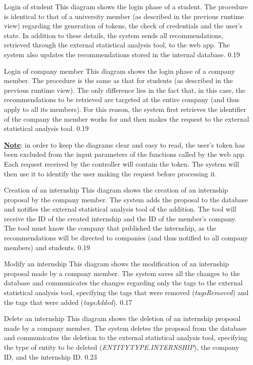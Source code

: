 \runtimeview
{Login of student}
{
    This diagram shows the login phase of a student. The procedure is identical to that of a university member (as described in the previous runtime view) regarding the generation of tokens, the check of credentials and the user's state. In addition to these details, the system sends all recommendations, retrieved through the external statistical analysis tool, to the web app. The system also updates the recommendations stored in the internal database.
}
{0.19}

\runtimeview
{Login of company member}
{
    This diagram shows the login phase of a company member. The procedure is the same as that for students (as described in the previous runtime view). The only difference lies in the fact that, in this case, the recommendations to be retrieved are targeted at the entire company (and thus apply to all its members). For this reason, the system first retrieves the identifier of the company the member works for and then makes the request to the external statistical analysis tool.
}
{0.19}

\noindent
\underline{\textbf{Note}}: in order to keep the diagrams clear and easy to read, the user's token has been excluded from the input parameters of the functions called by the web app. Each request received by the controller will contain the token. The system will then use it to identify the user making the request before processing it.

\runtimeview
{Creation of an internship}
{
    This diagram shows the creation of an internship proposal by the company member. The system adds the proposal to the database and notifies the external statistical analysis tool of the addition. The tool will receive the ID of the created internship and the ID of the member's company. The tool must know the company that published the internship, as the recommendations will be directed to companies (and thus notified to all company members) and students.
}
{0.19}

\runtimeview
{Modify an internship}
{
    This diagram shows the modification of an internship proposal made by a company member. The system saves all the changes to the database and communicates the changes regarding only the tags to the external statistical analysis tool, specifying the tags that were removed (\textit{tagsRemoved}) and the tags that were added (\textit{tagsAdded}).
}
{0.17}

\runtimeview
{Delete an internship}
{
    This diagram shows the deletion of an internship proposal made by a company member. The system deletes the proposal from the database and communicates the deletion to the external statistical analysis tool, specifying the type of entity to be deleted (\textit{ENTITYTYPE.INTERNSHIP}), the company ID, and the internship ID.
}
{0.23}

